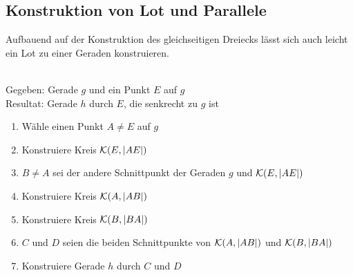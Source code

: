 \subsection*{Konstruktion von Lot und Parallele}

Aufbauend auf der Konstruktion des gleichseitigen Dreiecks lässt sich auch leicht ein Lot zu einer
Geraden konstruieren.

\begin{konst}\ \\
    Gegeben: Gerade $g$ und ein Punkt $E$ auf $g$\\
    Resultat: Gerade $h$ durch $E$, die senkrecht zu $g$ ist
    \renewcommand{\labelenumi}{\arabic{enumi}.} %
    \begin{enumerate}
        \item Wähle einen Punkt $A \neq E$ auf $g$
        \item Konstruiere Kreis ${\mathcal K}(E,|AE|)$
        \item $B \neq A$ sei der andere Schnittpunkt der Geraden $g$ und ${\mathcal K}(E,|AE|)$
        \item Konstruiere Kreis ${\mathcal K}(A,|AB|)$
        \item Konstruiere Kreis ${\mathcal K}(B,|BA|)$
        \item $C$ und $D$ seien die beiden Schnittpunkte von ${\mathcal K}(A,|AB|)$ und ${\mathcal K}(B,|BA|)$
        \item Konstruiere Gerade $h$ durch $C$ und $D$
    \end{enumerate}
\end{konst}


